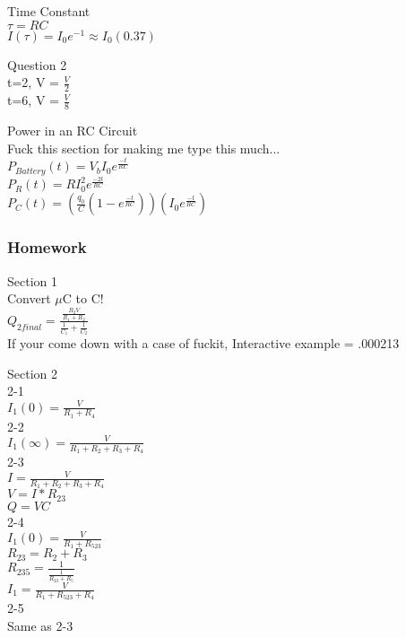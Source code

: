 \documentclass{article}
\begin{document}
\vspace{2mm}

\noindent
Time Constant \\
$\tau = RC$ \\
$I(\tau) = I_0e^{-1} \approx I_0(0.37)$

\vspace{2mm}

\noindent
Question 2 \\
t=2, V = $\frac{V}{2}$ \\
t=6, V = $\frac{V}{8}$

\vspace{2mm}

\noindent
Power in an RC Circuit \\
Fuck this section for making me type this much... \\
$P_{Battery}(t) = V_b I_0 e^{\frac{-t}{RC}}$ \\
$P_R(t) = RI_0^2 e^{\frac{-2t}{RC}}$ \\
$P_C(t) = (\frac{q_0}{C}(1 - e^{\frac{-t}{RC}}))(I_0 e^{\frac{-t}{RC}})$

\subsubsection{Homework}

\noindent
Section 1  \\
Convert $\mu$C to C! \\
$Q_{2final} = \frac{\frac{R_2 V}{R_1 + R_2}}{\frac{1}{C_1} + \frac{1}{C_2}}$ \\
If your come down with a case of fuckit, Interactive example = .000213

\vspace{2mm}

\noindent
Section 2 \\
2-1 \\
$I_1(0) = \frac{V}{R_1 + R_4}$ \\
2-2 \\
$I_1(\infty) = \frac{V}{R_1 + R_2 + R_3 + R_4}$ \\
2-3 \\
$I = \frac{V}{R_1 + R_2 + R_3 + R_4}$ \\
$V = I*R_{23}$ \\
$Q = VC$ \\
2-4 \\
$I_1(0) = \frac{V}{R_1+R_{523}}$ \\
$R_{23} = R_2 + R_3 $ \\
$R_{235} = \frac{1}{\frac{1}{R_{23} + R_5}}$ \\
$I_1 = \frac{V}{R_1 + R_{523} + R_4}$ \\
2-5 \\
Same as 2-3
\end{document}
